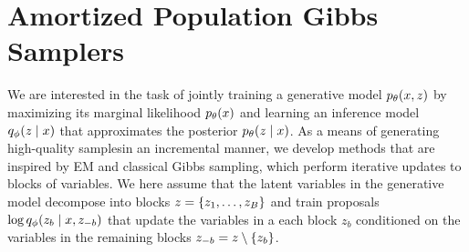 \documentclass[anonymous=false, %
               format=acmsmall, %
               review=true, %
               screen=true, %
               nonacm=true]{acmart}
\theoremstyle{definition}
\begin{document}
\section{Amortized Population Gibbs Samplers}
\label{sec:amortized-gibbs}
We are interested in the task of jointly training a generative model $p_\theta(x, z)$ by maximizing its marginal likelihood $p_\theta(x)$ and learning an inference model $q_\phi(z \mid x)$ that approximates the posterior $p_\theta(z \mid x)$. 
As a means of generating high-quality samplesin an incremental manner, we develop methods that are inspired by EM and classical Gibbs sampling, which perform iterative updates to blocks of variables. We here assume that the latent variables in the generative model decompose into blocks $z = \{z_1, \ldots, z_B\}$ and train proposals $\log q_\phi(z_b \mid x, z_{-b})$ that update the variables in a each block $z_{b}$ conditioned on the variables in the remaining blocks $z_{-b} = z \setminus \{z_b\}$.
\end{document}
